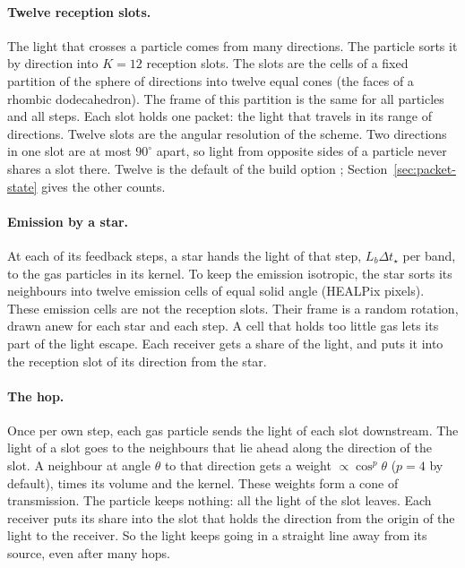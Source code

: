 \paragraph{Twelve reception slots.} The light that crosses a particle comes from
many directions. The particle sorts it by direction into $K=12$ reception
slots. The slots are the cells of a fixed partition of the sphere of
directions into twelve equal cones (the faces of a rhombic dodecahedron). The
frame of this partition is the same for all particles and all steps. Each slot
holds one packet: the light that travels in its range of directions. Twelve
slots are the angular resolution of the scheme. Two directions in one slot are
at most $90^\circ$ apart, so light from opposite sides of a particle never
shares a slot there. Twelve is the default of the build option
; Section~\ref{sec:packet-state} gives the
other counts.

\paragraph{Emission by a star.} At each of its feedback steps, a star hands
the light of that step, $L_b\Delta t_\star$ per band, to the gas particles in
its kernel. To keep the emission isotropic, the star sorts its neighbours into
twelve emission cells of equal solid angle (HEALPix pixels). These emission
cells are not the reception slots. Their frame is a random rotation, drawn
anew for each star and each step. A cell that holds too little gas lets its
part of the light escape. Each receiver gets a share of the light, and puts it
into the reception slot of its direction from the star.

\paragraph{The hop.} Once per own step, each gas particle sends the light of
each slot downstream. The light of a slot goes to the neighbours that lie
ahead along the direction of the slot. A neighbour at angle $\theta$ to that
direction gets a weight $\propto\cos^p\theta$ ($p=4$ by default), times its
volume and the kernel. These weights form a cone of transmission. The particle
keeps nothing: all the light of the slot leaves. Each receiver puts its share
into the slot that holds the direction from the origin of the light to the
receiver. So the light keeps going in a straight line away from its source,
even after many hops.

